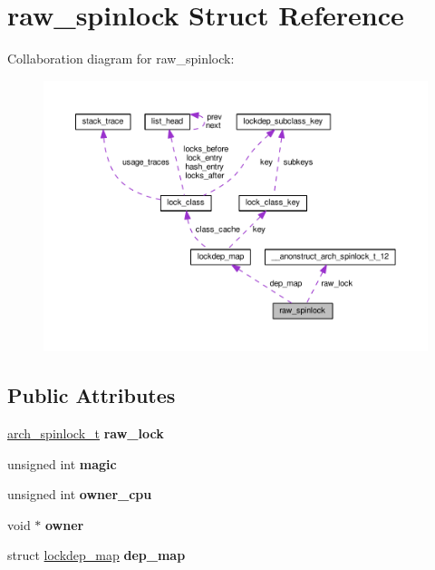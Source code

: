 \hypertarget{structraw__spinlock}{}\section{raw\+\_\+spinlock Struct Reference}
\label{structraw__spinlock}


Collaboration diagram for raw\+\_\+spinlock\+:
\nopagebreak
\begin{figure}[H]
\begin{center}
\leavevmode
\includegraphics[width=350pt]{structraw__spinlock__coll__graph}
\end{center}
\end{figure}
\subsection*{Public Attributes}
\begin{DoxyCompactItemize}
\item 
\hypertarget{structraw__spinlock_acd24edff91d704dd491efac67695e0ac}{}\hyperlink{struct____anonstruct__arch__spinlock__t__12}{arch\+\_\+spinlock\+\_\+t} {\bfseries raw\+\_\+lock}\label{structraw__spinlock_acd24edff91d704dd491efac67695e0ac}

\item 
\hypertarget{structraw__spinlock_ae2e17cf4b907aad90035857540ff8adc}{}unsigned int {\bfseries magic}\label{structraw__spinlock_ae2e17cf4b907aad90035857540ff8adc}

\item 
\hypertarget{structraw__spinlock_aa27c942f392a90e66155ce2ce6183fa0}{}unsigned int {\bfseries owner\+\_\+cpu}\label{structraw__spinlock_aa27c942f392a90e66155ce2ce6183fa0}

\item 
\hypertarget{structraw__spinlock_a8d8004048d59d5b9cc1a0ecfe46f833d}{}void $\ast$ {\bfseries owner}\label{structraw__spinlock_a8d8004048d59d5b9cc1a0ecfe46f833d}

\item 
\hypertarget{structraw__spinlock_ab3d94a2d45ec749c3cc111a3ad6ac700}{}struct \hyperlink{structlockdep__map}{lockdep\+\_\+map} {\bfseries dep\+\_\+map}\label{structraw__spinlock_ab3d94a2d45ec749c3cc111a3ad6ac700}

\end{DoxyCompactItemize}


